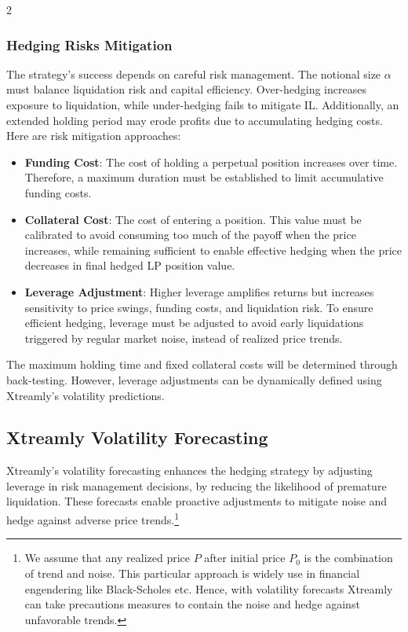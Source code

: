 \documentclass[10pt]{article}
\begin{document}
\begin{multicols}{2}
\subsubsection{Hedging Risks Mitigation}
The strategy’s success depends on careful risk management. The notional size $\alpha$ must balance liquidation risk and capital efficiency. Over-hedging increases exposure to liquidation, while under-hedging fails to mitigate IL. Additionally, an extended holding period may erode profits due to accumulating hedging costs. Here are risk mitigation approaches:
\begin{itemize}
	\item \textbf{Funding Cost}: The cost of holding a perpetual position increases over time. Therefore, a maximum duration must be established to limit accumulative funding costs.
	\item \textbf{Collateral Cost}: The cost of entering a position. This value must be calibrated to avoid consuming too much of the payoff when the price increases, while remaining sufficient to enable effective hedging when the price decreases in final hedged LP position value.
	\item \textbf{Leverage Adjustment}: Higher leverage amplifies returns but increases sensitivity to price swings, funding costs, and liquidation risk. To ensure efficient hedging, leverage must be adjusted to avoid early liquidations triggered by regular market noise, instead of realized price trends.
\end{itemize}

The maximum holding time and fixed collateral costs will be determined through back-testing. However, leverage adjustments can be dynamically defined using Xtreamly’s volatility predictions.

\subsection{Xtreamly Volatility Forecasting}
\label{sec:xtreamly}

Xtreamly’s volatility forecasting enhances the hedging strategy by adjusting leverage in risk management decisions, by reducing the likelihood of premature liquidation. These forecasts enable proactive adjustments to mitigate noise and hedge against adverse price trends.\footnote{We assume that any realized price $P$ after initial price $P_0$ is the combination of trend and noise. This particular approach is widely use in financial engendering like Black-Scholes etc. 
	Hence, with volatility forecasts Xtreamly can take precautions measures to contain the noise and hedge against unfavorable trends.}


\end{multicols}
\end{document}
